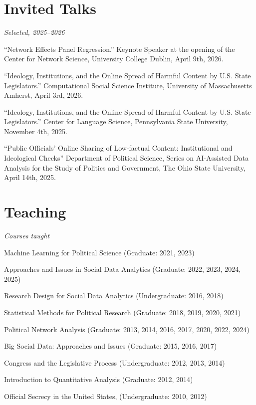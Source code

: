 \documentclass[overlapped,line]{res}
\begin{document}
\begin{resume}
\section{\bf Invited Talks}
\vspace{.1cm}
\hspace{-1cm} \emph{Selected, 2025--2026}
\vspace{.1cm}
\begin{etaremune}
\item ``Network Effects Panel Regression.'' Keynote Speaker at the opening of the Center for Network Science, University College Dublin, April 9th, 2026.
\item ``Ideology, Institutions, and the Online Spread of Harmful Content by U.S. State Legislators.'' Computational Social Science Institute, University of Massachusetts Amherst, April 3rd, 2026.
\item ``Ideology, Institutions, and the Online Spread of Harmful Content by U.S. State Legislators.'' Center for Language Science, Pennsylvania State University, November 4th, 2025.
\item ``Public Officials' Online Sharing of Low-factual Content: Institutional and Ideological Checks'' Department of Political Science, Series on AI-Assisted Data Analysis for the Study of Politics and Government, The Ohio State University, April 14th, 2025. 
\end{etaremune}



\section{\bf Teaching}
\vspace{.1cm}
\hspace{-1cm} \emph{Courses taught}
\begin{etaremune}
\item Machine Learning for Political Science (Graduate: 2021, 2023)
\item Approaches and Issues in Social Data Analytics (Graduate: 2022, 2023, 2024, 2025)
\item Research Design for Social Data Analytics (Undergraduate: 2016, 2018)
\item Statistical Methods for Political Research (Graduate: 2018, 2019, 2020, 2021)
\item Political Network Analysis (Graduate: 2013, 2014, 2016, 2017, 2020, 2022, 2024)
\item Big Social Data: Approaches and Issues (Graduate: 2015, 2016, 2017)
\item Congress and the Legislative Process (Undergraduate: 2012, 2013, 2014)
\item Introduction to Quantitative Analysis (Graduate: 2012, 2014)
\item Official Secrecy in the United States, (Undergraduate: 2010, 2012) 
\end{etaremune}


\end{resume}
\end{document}
